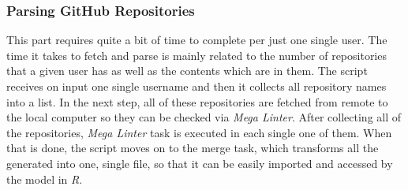\subsubsection{Parsing GitHub Repositories}
\label{sec:github-repo-parsing}

This part requires quite a bit of time to complete per just one single user. The time it takes to fetch and parse is mainly related to the number of repositories that a given user has as well as the contents which are in them. The script receives on input one single username and then it collects all repository names into a list. In the next step, all of these repositories are fetched from remote to the local computer so they can be checked via \emph{Mega Linter}. After collecting all of the repositories, \emph{Mega Linter} task is executed in each single one of them. When that is done, the script moves on to the merge task, which transforms all the generated  into one, single  file, so that it can be easily imported and accessed by the model in \emph{R}.



